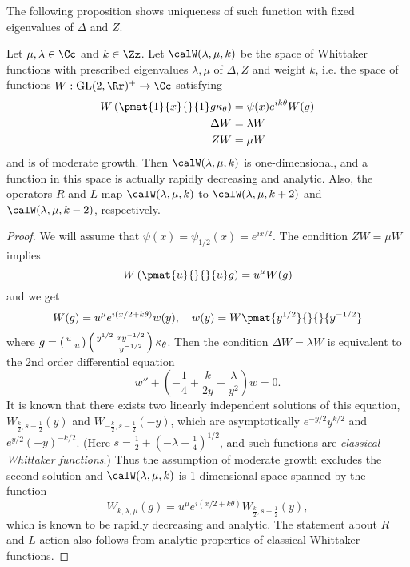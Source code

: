 The following proposition shows uniqueness of such function with fixed eigenvalues of $\Delta$ and $Z$. 
\begin{proposition}
Let $\mu, \lambda\in \Cc$ and $k\in \Zz$. Let $\calW(\lambda, \mu, k)$ be the space of Whittaker functions with prescribed eigenvalues $\lambda, \mu$ of $\Delta, Z$  and weight $k$, i.e. the space of functions $W:\GL(2, \Rr)^{+}\to \Cc$ satisfying 
\begin{align*}
W\left( \pmat{1}{x}{}{1}g \kappa_{\theta}\right) &= \psi(x)e^{ik\theta}W(g) \\
\Delta W &= \lambda W \\
ZW &= \mu W
\end{align*}
and is of moderate growth. Then $\calW(\lambda, \mu, k)$ is one-dimensional, and a function in this space is actually rapidly decreasing and analytic. 
Also, the operators $R$ and $L$ map $\calW(\lambda, \mu,k)$ to $\calW(\lambda, \mu, k+2)$ and $\calW(\lambda, \mu, k-2)$, respectively. 
\end{proposition}
\begin{proof}
We will assume that $\psi(x) =\psi_{1/2}(x) = e^{ix/2}$. The condition $ZW = \mu W$ implies 
$$
W\left(\pmat{u}{}{}{u}g\right) = u^{\mu} W(g)
$$
and we get
\begin{align*}
W(g) = u^{\mu} e^{i(x/2+k\theta)}w(y), \quad w(y) = W\pmat{y^{1/2}}{}{}{y^{-1/2}}\end{align*}
where $g = \left(\begin{smallmatrix} u &  \\  & u \end{smallmatrix}\right) \left(\begin{smallmatrix} y^{1/2} & xy^{-1/2} \\  & y^{-1/2} \end{smallmatrix}\right) \kappa_{\theta}$. 
Then the condition $\Delta W = \lambda W$ is equivalent to the 2nd order differential equation
$$
w'' + \left(-\frac{1}{4} + \frac{k}{2y} + \frac{\lambda}{y^{2}}\right)w = 0.
$$
It is known that there exists two linearly independent solutions of this equation, $W_{\frac{k}{2}, s-\frac{1}{2}}(y)$ and $W_{-\frac{k}{2}, s-\frac{1}{2}}(-y)$, which are asymptotically $e^{-y/2}y^{k/2}$ and $e^{y/2}(-y)^{-k/2}$.  (Here $s = \frac{1}{2} + (-\lambda + \frac{1}{4})^{1/2}$, and such functions are \emph{classical Whittaker functions}.) 
Thus the assumption of moderate growth excludes the second solution and $\calW(\lambda, \mu, k)$ is 1-dimensional space spanned by the function
$$
W_{k, \lambda, \mu}(g) = u^{\mu}e^{i(x/2 + k\theta)} W_{\frac{k}{2}, s-\frac{1}{2}}(y),
$$
which is known to be rapidly decreasing and analytic. 
The statement about $R$ and $L$ action also follows from analytic properties of classical Whittaker functions. 
\end{proof}

